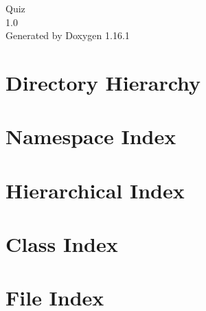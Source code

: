 \documentclass[twoside]{book}
\newcommand{\+}{\discretionary{\mbox{\scriptsize$\hookleftarrow$}}{}{}}
\newcommand{\clearemptydoublepage}{%
    \newpage{\pagestyle{empty}\cleardoublepage}%
  }
\begin{document}
  \raggedbottom
    \hypersetup{pageanchor=false,
                bookmarksnumbered=true,
                pdfencoding=unicode
               }
  \begin{titlepage}
  \vspace*{7cm}
  \begin{center}%
  {\Large Quiz}\\
  [1ex]\large 1.\+0 \\
  \vspace*{1cm}
  {\large Generated by Doxygen 1.16.1}\\
  \end{center}
  \end{titlepage}
  \clearemptydoublepage
  \tableofcontents
  \clearemptydoublepage
  \hypersetup{pageanchor=true}
\chapter{Directory Hierarchy}

\chapter{Namespace Index}

\chapter{Hierarchical Index}

\chapter{Class Index}

\chapter{File Index}

\end{document}
